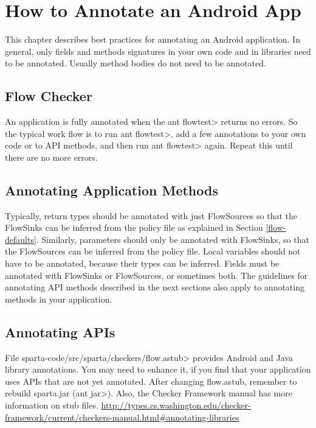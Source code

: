 \htmlhr
\chapter{How to Annotate an Android App\label{app-annotation}}

This chapter describes best practices for annotating an Android application.  In general, only 
fields and methods signatures in your own code and in libraries need to be annotated. Usually method bodies do not need to be annotated.

\section{Flow Checker\label{flowchecker}}
An application is fully annotated when the \<ant flowtest> returns no errors.  So the typical work flow is 
to run \<ant flowtest>, add a few annotations to your own code or to API methods, and then run \<ant flowtest> again.  
Repeat this until there are no more errors.



\section{Annotating Application Methods\label{sec:annomethods}}

Typically, return types should be annotated with just FlowSources so that the FlowSinks can be
 inferred from the policy file as explained in Section \ref{flow-defaults}. Similarly, parameters should
  only be annotated with FlowSinks, so that the FlowSources can be inferred from  the policy file.
    Local variables should not have to be annotated, because their types can be inferred. Fields 
    must be annotated with  FlowSinks or FlowSources, or sometimes both. The guidelines for annotating 
    API methods described in the next sections also apply to annotating methods in your application. 


\section{Annotating APIs\label{sec:annotatedAPI}}

File \<sparta-code/src/sparta/checkers/flow.astub> provides Android and Java
library annotations.  You may need to enhance it, if you find that your application
uses APIs that are not yet annotated.  After changing flow.astub, remember to rebuild sparta.jar (\<ant jar>).
Also, the Checker Framework manual has more information on stub files. 
\url{http://types.cs.washington.edu/checker-framework/current/checkers-manual.html#annotating-libraries}

